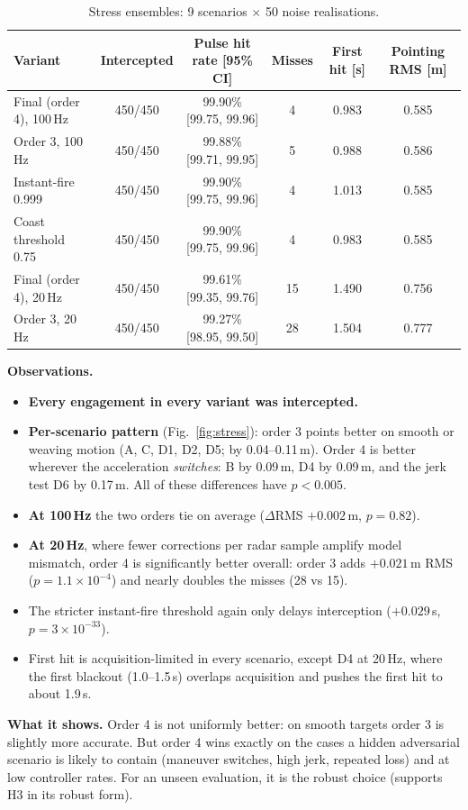 \documentclass[11pt,a4paper]{article}
\newcommand{\obs}[1]{\par\smallskip\noindent\textbf{Observations.} #1\par\smallskip}
\newcommand{\takeaway}[1]{\noindent\textbf{What it shows.} #1\par\medskip}
\begin{document}
\begin{table}[H]
\centering\small
\caption{Stress ensembles: 9 scenarios $\times$ 50 noise realisations.}
\label{tab:stress}
\begin{tabular}{lccccc}
\toprule
Variant & Intercepted & Pulse hit rate [95\% CI] & Misses & First hit [s] & Pointing RMS [m]\\
\midrule
Final (order 4), 100\,Hz & 450/450 & 99.90\% [99.75, 99.96] & 4 & 0.983 & 0.585\\
Order 3, 100\,Hz & 450/450 & 99.88\% [99.71, 99.95] & 5 & 0.988 & 0.586\\
Instant-fire 0.999 & 450/450 & 99.90\% [99.75, 99.96] & 4 & 1.013 & 0.585\\
Coast threshold 0.75 & 450/450 & 99.90\% [99.75, 99.96] & 4 & 0.983 & 0.585\\
Final (order 4), 20\,Hz & 450/450 & 99.61\% [99.35, 99.76] & 15 & 1.490 & 0.756\\
Order 3, 20\,Hz & 450/450 & 99.27\% [98.95, 99.50] & 28 & 1.504 & 0.777\\
\bottomrule
\end{tabular}
\end{table}

\obs{
\begin{itemize}
\item \textbf{Every engagement in every variant was intercepted.}
\item \textbf{Per-scenario pattern} (Fig.~\ref{fig:stress}): order 3 points better on smooth or weaving motion (A, C, D1, D2, D5; by 0.04--0.11\,m). Order 4 is better wherever the acceleration \emph{switches}: B by 0.09\,m, D4 by 0.09\,m, and the jerk test D6 by 0.17\,m. All of these differences have $p<0.005$.
\item \textbf{At 100\,Hz} the two orders tie on average ($\Delta$RMS $+0.002$\,m, $p=0.82$).
\item \textbf{At 20\,Hz}, where fewer corrections per radar sample amplify model mismatch, order 4 is significantly better overall: order 3 adds $+0.021$\,m RMS ($p=1.1\times10^{-4}$) and nearly doubles the misses (28 vs 15).
\item The stricter instant-fire threshold again only delays interception ($+0.029$\,s, $p=3\times10^{-33}$).
\item First hit is acquisition-limited in every scenario, except D4 at 20\,Hz, where the first blackout (1.0--1.5\,s) overlaps acquisition and pushes the first hit to about 1.9\,s.
\end{itemize}}
\takeaway{Order 4 is not uniformly better: on smooth targets order 3 is slightly more accurate. But order 4 wins exactly on the cases a hidden adversarial scenario is likely to contain (maneuver switches, high jerk, repeated loss) and at low controller rates. For an unseen evaluation, it is the robust choice (supports H3 in its robust form).}
\end{document}
